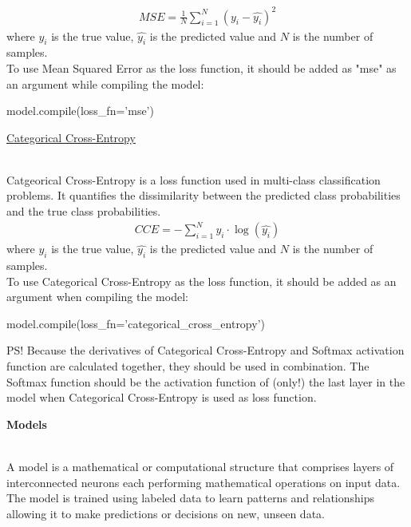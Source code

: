 \documentclass{article}
\begin{document}
    \begin{align*}
        MSE = \frac{1}{N} \sum_{i=1}^{N} (y_{i} - \hat{y_{i}})^{2}
    \end{align*}
    where $y_{i}$ is the true value, $\hat{y_{i}}$ is the predicted value
    and $N$ is the number of samples.\\

    To use Mean Squared Error as the loss function, it should be added as "mse" as an argument
    while compiling the model:
\begin{python}
model.compile(loss_fn='mse')
\end{python}
    \pagebreak

    \hypertarget{cce}{\underline{Categorical Cross-Entropy}} \\

    Catgeorical Cross-Entropy is a loss function used in multi-class 
    classification problems. It quantifies the dissimilarity between 
    the predicted class probabilities and the true class 
    probabilities.
    \begin{align*}
        CCE = -\sum_{i=1}^{N} y_{i} \cdot \log{(\hat{y_{i}})}
    \end{align*}
    where $y_{i}$ is the true value, $\hat{y_{i}}$ is the predicted value
    and $N$ is the number of samples. \\

    To use Categorical Cross-Entropy as the loss function, it should be added as an argument
    when compiling the model:
\begin{python}
model.compile(loss_fn='categorical_cross_entropy')
\end{python}

    PS! Because the derivatives of Categorical Cross-Entropy and Softmax activation
    function are calculated together, they should be used in combination. The Softmax 
    function should be the activation function of (only!) the last layer in the model when 
    Categorical Cross-Entropy is used as loss function.
    \clearpage

    \hypertarget{models}{\textbf{Models}} \\

    A model is a mathematical or computational structure that comprises 
    layers of interconnected neurons each performing mathematical operations 
    on input data. The model is trained using labeled data to learn 
    patterns and relationships allowing it to make predictions or decisions 
    on new, unseen data. \\
\end{document}
